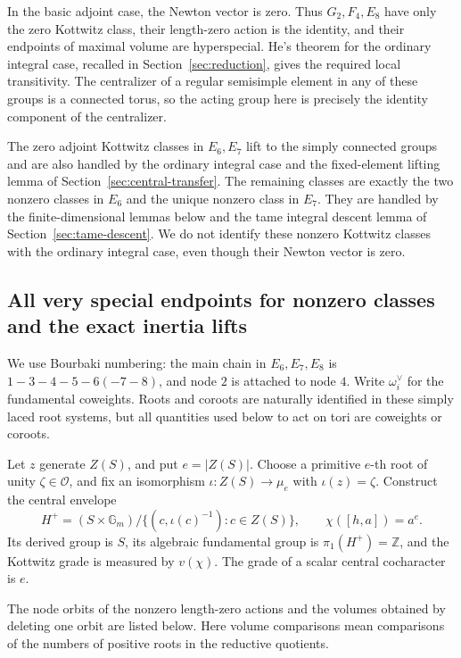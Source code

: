 \documentclass[11pt,a4paper]{article}
\theoremstyle{definition}
\theoremstyle{remark}
\begin{document}
In the basic adjoint case, the Newton vector is zero. Thus \(G_2,F_4,E_8\)
have only the zero Kottwitz class, their length-zero action is the identity,
and their endpoints of maximal volume are hyperspecial. He's theorem for
the ordinary integral case, recalled in Section~\ref{sec:reduction}, gives
the required local transitivity. The centralizer of a regular semisimple
element in any of these groups is a connected torus, so the acting group
here is precisely the identity component of the centralizer.

The zero adjoint Kottwitz classes in \(E_6,E_7\) lift to the simply connected
groups and are also handled by the ordinary integral case and the
fixed-element lifting lemma of Section~\ref{sec:central-transfer}.
The remaining classes are exactly the two nonzero classes in \(E_6\) and
the unique nonzero class in \(E_7\). They are handled by the finite-dimensional
lemmas below and the tame integral descent lemma of
Section~\ref{sec:tame-descent}. We do not identify these nonzero Kottwitz
classes with the ordinary integral case, even though their Newton vector
is zero.

\subsection{All very special endpoints for nonzero classes and the exact inertia lifts}
\label{subsec:ex-inertia}

We use Bourbaki numbering: the main chain in \(E_6,E_7,E_8\) is
\(1-3-4-5-6(-7-8)\), and node \(2\) is attached to node \(4\).
Write \(\omega_i^\vee\) for the fundamental coweights.
Roots and coroots are naturally identified in these simply laced root
systems, but all quantities used below to act on tori are coweights or
coroots.

Let \(z\) generate \(Z(S)\), and put \(e=|Z(S)|\).
Choose a primitive \(e\)-th root of unity
\(\zeta\in\mathcal O\), and fix an isomorphism
\(\iota:Z(S)\longrightarrow\mu_e\) with \(\iota(z)=\zeta\).
Construct the central envelope
\begin{equation}\label{eq:ex-central-envelope}
H^+=(S\times\mathbb G_m)/
 \{(c,\iota(c)^{-1}):c\in Z(S)\},
\qquad
\chi([h,a])=a^e.
\end{equation}
Its derived group is \(S\), its algebraic fundamental group is
\(\pi_1(H^+)=\mathbb Z\), and the Kottwitz grade is measured by
\(v(\chi)\). The grade of a scalar central cocharacter is \(e\).

The node orbits of the nonzero length-zero actions and the volumes obtained
by deleting one orbit are listed below. Here volume comparisons mean
comparisons of the numbers of positive roots in the reductive quotients.
\end{document}
